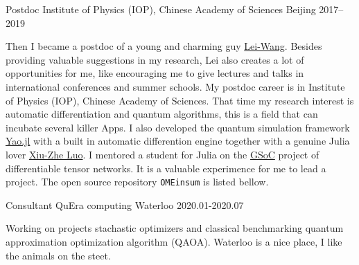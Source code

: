 \documentclass[11pt, a4paper]{awesome-cv}
\begin{document}
\begin{cvskills}
\end{cvskills}
\begin{cventries}
  \cventry
    {Postdoc}
    {Institute of Physics (IOP), Chinese Academy of Sciences}
    {Beijing}
    {2017--2019}
    {\begin{cvitems}
        Then I became a postdoc of a young and charming guy \href{http://wangleiphy.github.io/}{Lei-Wang}. Besides providing valuable suggestions in my research, Lei also creates a lot of opportunities for me, like encouraging me to give lectures and talks in international conferences and summer schools.
        My postdoc career is in Institute of Physics (IOP), Chinese Academy of Sciences. That time my research interest is automatic differentiation and quantum algorithms, this is a field that can incubate several killer Apps. I also developed the quantum simulation framework \href{https://github.com/QuantumBFS/Yao.jl}{Yao.jl} with a built in automatic differention engine together with a genuine Julia lover \href{http://blog.rogerluo.me/}{Xiu-Zhe Luo}.
        I mentored a student for Julia on the \href{https://summerofcode.withgoogle.com/}{GSoC} project of differentiable tensor networks. It is a valuable experimence for me to lead a project. The open source repository \texttt{OMEinsum} is listed bellow.
    \end{cvitems}}
  \cventry
    {Consultant}
    {QuEra computing}
    {Waterloo}
    {2020.01-2020.07}  %
    {\begin{cvitems}
        Working on projects stachastic optimizers and classical benchmarking quantum approximation optimization algorithm (QAOA). Waterloo is a nice place, I like the animals on the steet.
    \end{cvitems}}


\end{cventries}
\end{document}
